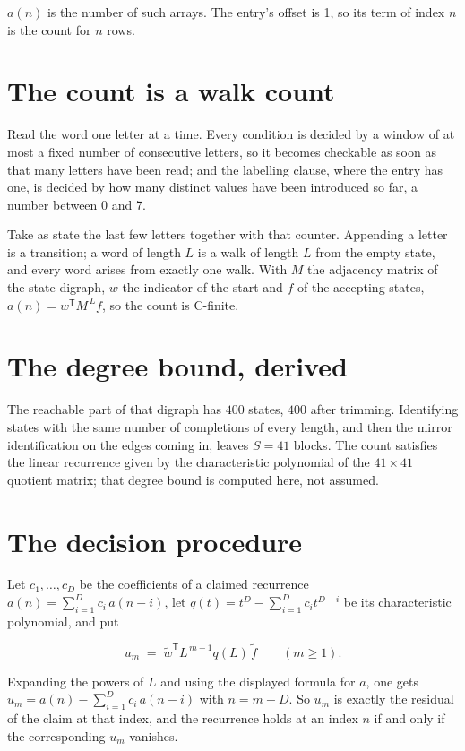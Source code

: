 \documentclass[11pt]{article}
\theoremstyle{definition}
\begin{document}
$a(n)$ is the number of such arrays. The entry's offset is 1, so its term of index $n$ is the count for $n$ rows.

\section{The count is a walk count}

Read the word one letter at a time. Every condition is decided by a window of at most a fixed number of consecutive letters, so it becomes checkable as soon as that many letters have been read; and the labelling clause, where the entry has one, is decided by how many distinct values have been introduced so far, a number between $0$ and 7.

Take as state the last few letters together with that counter. Appending a letter is a transition; a word of length $L$ is a walk of length $L$ from the empty state, and every word arises from exactly one walk. With $M$ the adjacency matrix of the state digraph, $w$ the indicator of the start and $f$ of the accepting states, $a(n) = w^{\mathsf T}M^{\,L}f$, so the count is C-finite.

\section{The degree bound, derived}

The reachable part of that digraph has $400$ states, $400$ after trimming. Identifying states with the same number of completions of every length, and then the mirror identification on the edges coming in, leaves $S = 41$ blocks. The count satisfies the linear recurrence given by the characteristic polynomial of the $41\times41$ quotient matrix; that degree bound is computed here, not assumed.

\section{The decision procedure}

Let $c_1,\dots,c_D$ be the coefficients of a claimed recurrence $a(n) = \sum_{i=1}^{D} c_i\,a(n-i)$, let $q(t) = t^{D} - \sum_{i=1}^{D} c_i t^{D-i}$ be its characteristic polynomial, and put

\[u_m \;=\; \tilde w^{\mathsf T} L^{\,m-1} q(L)\,\tilde f \qquad (m \ge 1).\]

Expanding the powers of $L$ and using the displayed formula for $a$, one gets $u_m = a(n) - \sum_{i=1}^{D} c_i\,a(n-i)$ with $n = m + D$. So $u_m$ is exactly the residual of the claim at that index, and the recurrence holds at an index $n$ if and only if the corresponding $u_m$ vanishes.
\end{document}
